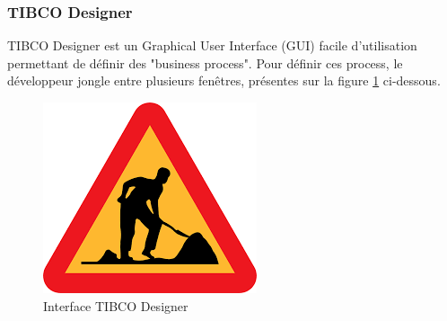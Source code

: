 \subsubsection{TIBCO Designer}
TIBCO Designer est un Graphical User Interface (GUI) facile d'utilisation permettant de
définir des "business process". Pour définir ces process, le développeur jongle entre plusieurs
fenêtres, présentes sur la figure \ref{fig:encours} ci-dessous.
\begin{figure}[h!]
	\centering
	\includegraphics[width=0.5\linewidth]{img/encours}
	\caption{Interface TIBCO Designer}
	\label{fig:encours}
\end{figure}
